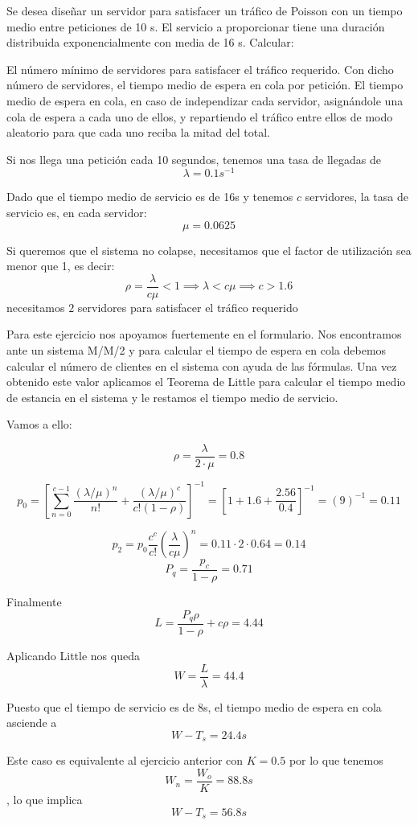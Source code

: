 \begin{problem}[3]
Se desea diseñar un servidor para satisfacer un tráfico de Poisson con un tiempo medio entre peticiones de 10 s. El servicio a proporcionar tiene una duración distribuida exponencialmente con media de 16 s. Calcular:

\ppart El número mínimo de servidores para satisfacer el tráfico requerido.
\ppart Con dicho número de servidores, el tiempo medio de espera en cola por petición.
\ppart El tiempo medio de espera en cola, en caso de independizar cada servidor, asignándole una cola de espera a cada uno de ellos, y repartiendo el tráfico entre ellos de modo aleatorio para que cada uno reciba la mitad del total.

\solution

\yoP

\spart

Si nos llega una petición cada 10 segundos, tenemos una tasa de llegadas de
\[λ = 0.1 s^{-1}\]

Dado que el tiempo medio de servicio es de 16s y tenemos $c$ servidores, la tasa de servicio es, en cada servidor:
\[μ=0.0625\]

Si queremos que el sistema no colapse, necesitamos que el factor de utilización sea menor que 1, es decir:
\[ρ = \frac{λ}{cμ}<1 \implies λ < cμ \implies c>1.6\]
necesitamos $\boxed{2}$ servidores para satisfacer el tráfico requerido

\spart

Para este ejercicio nos apoyamos fuertemente en el formulario. Nos encontramos ante un sistema M/M/2 y para calcular el tiempo de espera en cola debemos calcular el número de clientes en el sistema con ayuda de las fórmulas. Una vez obtenido este valor aplicamos el Teorema de Little para calcular el tiempo medio de estancia en el sistema y le restamos el tiempo medio de servicio.

Vamos a ello:

\[ρ = \frac{λ}{2\cdot μ}=0.8\]

\[p_0 = \left[ \sum_{n=0}^{c-1}\frac{(λ/μ)^n}{n!}+\frac{(λ/μ)^c}{c!(1-ρ)}\right]^{-1}=\left[1+1.6+\frac{2.56}{0.4}\right]^{-1}=(9)^{-1}=0.11\]

\[p_2=p_0\frac{c^c}{c!}\left( \frac{λ}{cμ}\right)^n=0.11\cdot 2 \cdot 0.64 = 0.14\]
\[P_q=\frac{p_c}{1-ρ}=0.71\]

Finalmente
\[L=\frac{P_q ρ}{1-ρ}+cρ=4.44\]

Aplicando Little nos queda
\[W = \frac{L}{λ}=44.4\]

Puesto que el tiempo de servicio es de 8s, el tiempo medio de espera en cola asciende a
\[W-T_s=\boxed{24.4s}\]

\spart

Este caso es equivalente al ejercicio anterior con $K=0.5$ por lo que tenemos
\[W_n =\frac{W_o}{K}=88.8s\], lo que implica
\[W-T_s = \boxed{56.8s}\]

\end{problem}


